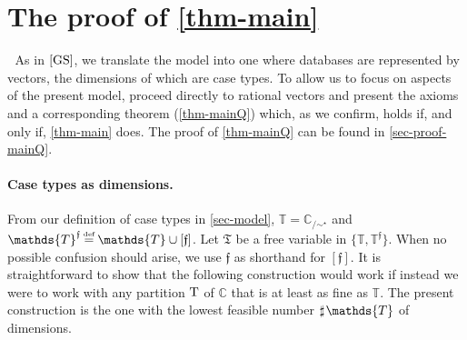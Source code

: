 \documentclass[12pt,a4paper,twoside]{article}
\makeatletter
\def\@seccntformat#1{\csname the#1\endcsname.\quad}
\newcommand{\srcsize}{\@setfontsize{\srcsize}{3pt}{3pt}}
\newcommand{\gsii}{$\textup{[GS]}$}
\newcommand{\novel}{\mathfrak f}
\newcommand{\nnint}{{\mbb Z}_{\mplus}}
\newcommand\mplus{\text{\srcsize$+$}}
\newcommand{\reg}{\operatorname{reg}}
\newcommand{\preceqb}{\mathbin{\preceq}}
\newcommand{\countof}{\mathbin{\sharp}\hskip1pt}
\newcommand{\ext}{\mathrel{\mc R}}
\newcommand{\supext}{{\ext}}
\newcommand{\mbbd}{{\mathds D}}
\newcommand{\mbbc}{{\mathds C}}
\newcommand{\mbbt}{{\mathds {T}}}
\newcommand{\mbbtp}{{\mathds{T} ^ \novel }}
\newcommand{\mbbtpp}{{\mathfrak{T}}}
\newcommand{\mbbi}{{\mathds L}}
\newcommand{\mbbip}{{\mathds{L}^{\novel}}}
\newcommand{\types}{{\textup T ^ { \novel }}}
\makeatother
\begin{document}
 
\makeatletter
\def\@seccntformat#1{Appendix\,\csname the#1\endcsname.\quad}
\makeatother
\begin{appendices}
\section{The proof of \cref{thm-main}}\label{sec-proof-main}




As in \gsii, we  translate the model into one where
databases are represented by vectors, the dimensions of which are
case types. To allow us to focus on aspects of the present model, 
proceed directly to rational vectors and present the axioms  and a corresponding
theorem (\cref{thm-mainQ}) which, as we confirm, holds if,
and only if,  \cref{thm-main} does. The proof of \cref{thm-mainQ} can be found
in \cref{sec-proof-mainQ}.


\paragraph{Case types as dimensions.}%
From our definition of case types in  \cref{sec-model}, $ \mbbt = \mbbc_{/\sim^{\star}} $ and
$ \mbbt^\novel \defeq \mbbt\cup [ \novel ]$. Let $ \mbbtpp $ be a free variable
in $ \{ \mbbt , \mbbtp \}$.  When no possible confusion should arise, we use
$ \novel $ as shorthand for $ [ \novel ] $.  It is straightforward to show that
the following construction would work if instead we were to work with any
partition $\textup T$ of $\mbbc $ that is at least as fine as $\mbbt$. The
present construction is the one with the lowest feasible number $\countof \mbbt$
of dimensions.


\end{appendices}
\end{document}
